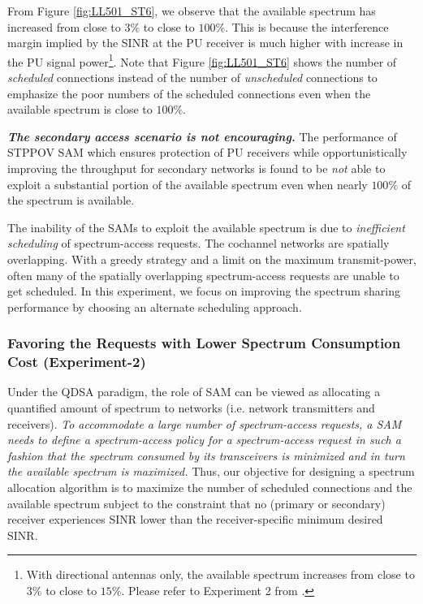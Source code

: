 \documentclass[12pt, draftclsnofoot, onecolumn]{IEEEtran}
\begin{document}
From Figure \ref{fig:LL501_ST6}, we observe that the available spectrum has increased from close to $3 \%$ to close to $100 \%$. This is because the interference margin implied by the SINR at the PU receiver is much higher with increase in the PU signal power\footnote{With directional antennas only, the available spectrum increases from close to $3 \%$ to close to $15 \%$. Please refer to Experiment 2 from \cite{oms3_cf1}.}.  Note that Figure \ref{fig:LL501_ST6} shows the number of \textit{scheduled} connections instead of the number of \textit{unscheduled} connections to emphasize the poor numbers of the scheduled connections even when the available spectrum is close to $100\%$.

\textbf{\textit{The secondary access scenario is not encouraging.}} The performance of STPPOV SAM which ensures protection of PU receivers while opportunistically improving the throughput for secondary networks is found to be \textit{not} able to exploit a substantial portion of the available spectrum even when nearly  $100\%$ of the spectrum is available. 

The inability of the SAMs to exploit the available spectrum is due to \textit{inefficient scheduling} of spectrum-access requests. The cochannel networks are spatially overlapping. With a greedy strategy and a limit on the maximum transmit-power, often many of the spatially overlapping spectrum-access requests are unable to get scheduled. In this experiment, we focus on improving the spectrum sharing performance by choosing an alternate scheduling approach. 

\subsubsection{Favoring the Requests with Lower Spectrum Consumption Cost (Experiment-2)}
Under the QDSA paradigm, the role of SAM can be viewed as allocating a quantified amount of spectrum to networks (i.e. network transmitters and receivers). \textit{To accommodate a large number of spectrum-access requests, a SAM needs to define a spectrum-access policy for a spectrum-access request in such a fashion that the spectrum consumed by its transceivers is minimized and in turn the available spectrum is maximized.} Thus, our objective for designing a spectrum allocation algorithm is to maximize the number of scheduled connections and the available spectrum subject to the constraint that no (primary or secondary) receiver experiences SINR lower than the receiver-specific minimum desired SINR.
\end{document}
